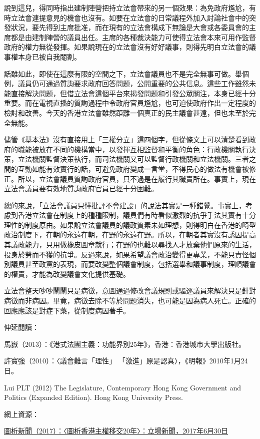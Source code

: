 說到這兒，得同時指出建制陣營把持立法會帶來的另一個效果：為免政府尷尬，有時立法會連提意見的機會也沒有。如要在立法會的日常議程外加入討論社會中的突發狀況，要先得到主席批准，而在現有的立法會構成下無論是大會或各委員會的主席都是由建制陣營的議員出任。主席的各種裁決能力可使得立法會本來可用作監督政府的權力無從發揮。如果說現在的立法會沒有好好議事，則得先明白立法會的議事權本身已被自我閹割。

話雖如此，即使在這麼有限的空間之下，立法會議員也不是完全無事可做。舉個例，議員仍可通過質詢要求政府回答問題，公開重要的公共信息。這些工作雖然未能直接解決問題，但借立法會這個平台來揭發問題和引發公眾關注，本身已經十分重要。而在電視直播的質詢過程中令政府官員尷尬，也可迫使政府作出一定程度的檢討和改善。今天的香港立法會雖然距離一個真正的民主議會甚遠，但也未至於完全無能。

儘管《基本法》沒有直接用上「三權分立」這四個字，但從條文上可以清楚看到政府的職能被放在不同的機構當中，以發揮互相監督和平衡的角色：行政機關執行決策，立法機關監督決策執行，而司法機關又可以監督行政機關和立法機關。三者之間的互動如能有效實行的話，可避免政府變成一言堂，不得民心的做法有機會被修正。所以，立法會議員質詢政府官員，只不過是在履行其職責所在。事實上，現在立法會議員要有效地質詢政府官員已經十分困難。

總的來說，「立法會議員只懂批評不會建設」的說法其實是一種錯覺。事實上，考慮到香港立法會在制度上的種種限制，議員們有時看似激烈的抗爭手法其實有十分理性的制度原由。如果說立法會議員的議政質素未如理想，則得明白在香港的畸型政治制度下，在朝的永遠在朝，在野的永遠在野。所以，在朝者其實沒有誘因提高其議政能力，只用做橡皮圖章就行；在野的也難以尋找人才放棄他們原來的生活，投身於勞而不獲的抗爭。反過來說，如果希望議會政治變得更專業，不能只責怪個別議員甚至政黨的表現，而要改變整個議會制度，包括選舉和議事制度，理順議會的權責，才能為改變議會文化提供基礎。

立法會整天吵吵鬧鬧只是病徵，意圖通過修改會議規則或驅逐議員來解決只是針對病徵而非病因。畢竟，病徵去除不等於問題消失，也可能是因為病人死亡。正確的回應應該是對症下藥，從制度病因著手。



伸延閱讀：

馬嶽（2013）：《港式法團主義：功能界別25年》，香港：香港城市大學出版社。

許寶強（2010）：〈議會難言「理性」 「激進」原是認真〉，《明報》2010年1月24日。

Lui PLT (2012) The Legislature, Contemporary Hong Kong Government and Politics (Expanded Edition). Hong Kong University Press.

網上資源：

\href{https://thestandnews.com/politics/圖析香港主權移交20年/}{圖析新聞（2017）：〈圖析香港主權移交20年〉：立場新聞，2017年6月30日}
